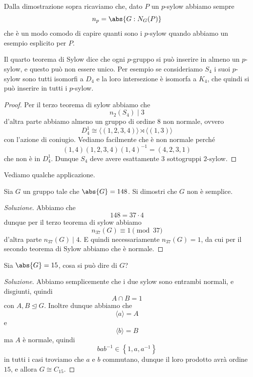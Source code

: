 \documentclass[11pt]{scrartcl}
\newcommand{\normal}{\mathrel{\unlhd}}
\begin{document}
	 \begin{remark}
	 	Dalla dimostrazione sopra ricaviamo che, dato $P$ un $p$-sylow abbiamo sempre
	 	$$n_p=\abs{G:N_G(P)}$$
	 	che è un modo comodo di capire quanti sono i $p$-sylow quando abbiamo un esempio esplicito per $P$.
	 \end{remark}
	 \begin{example}
	 	Il quarto teorema di Sylow dice che ogni $p$-gruppo si può inserire in almeno un $p$-sylow, e questo può non essere unico. Per esempio se consideriamo $S_4$ i suoi $p$-sylow sono tutti isomorfi a $D_4$ e la loro intersezione è isomorfa a $K_4$, che quindi si può inserire in tutti i $p$-sylow.
	 \end{example}
	 \begin{proof}
	 	Per il terzo teorema di sylow abbiamo che
	 	$$n_2(S_4)\mid 3$$
	 	d'altra parte abbiamo almeno un gruppo di ordine $8$ non normale, ovvero
	 	$$D^1_4 \cong \langle (1,2,3,4)\rangle \rtimes \langle (1,3)\rangle$$
	 	con l'azione di coniugio. Vediamo facilmente che è non normale perché
	 	$$(1,4)(1,2,3,4)(1,4)^{-1}=(4,2,3,1)$$
	 	che non è in $D_4^1$. Dunque $S_4$ deve avere esattamente $3$ sottogruppi $2$-sylow.
	 \end{proof}
	 Vediamo qualche applicazione. 
	 \begin{exercise}
	 	Sia $G$ un gruppo tale che $\abs{G}=148$. Si dimostri che $G$ non è semplice. 
	 \end{exercise}
	 \begin{proof}[Soluzione]
	 	Abbiamo che 
	 	$$148=37\cdot 4$$
	 	dunque per il terzo teorema di sylow abbiamo
	 	$$n_{37}(G)\equiv 1 \pmod{37}$$
	 	d'altra parte $n_{37}(G)\mid 4$. E quindi necessariamente $n_{37}(G)=1$, da cui per il secondo teorema di Sylow abbiamo che è normale.
	 \end{proof}
	 \begin{exercise}
	 	Sia $\abs{G}=15$, cosa si può dire di $G$?
	 \end{exercise}
	 \begin{proof}[Soluzione]
	 	Abbiamo semplicemente che i due sylow sono entrambi normali, e disgiunti, quindi
	 	$$A\cap B=1$$
	 	con $A,B\normal G$. Inoltre dunque abbiamo che
	 	$$\langle a \rangle = A$$
	 	e 
	 	$$\langle b \rangle = B$$
	 	ma $A$ è normale, quindi
	 	$$bab^{-1}\in \left\{1,a,a^{-1}\right\}$$
	 	in tutti i casi troviamo che $a$ e $b$ commutano, dunque il loro prodotto avrà ordine $15$, e allora $G\cong C_{15}$.
	 \end{proof}
\end{document}
